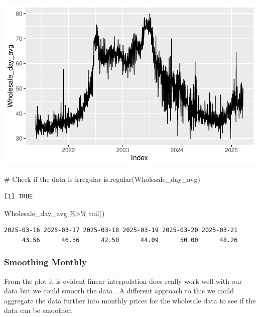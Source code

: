 \documentclass[
  letterpaper,
  DIV=11,
  numbers=noendperiod]{scrartcl}
\newenvironment{Shaded}{\begin{snugshade}}{\end{snugshade}}
\newcommand{\CommentTok}[1]{\textcolor[rgb]{0.37,0.37,0.37}{#1}}
\newcommand{\FunctionTok}[1]{\textcolor[rgb]{0.28,0.35,0.67}{#1}}
\newcommand{\NormalTok}[1]{\textcolor[rgb]{0.00,0.23,0.31}{#1}}
\newcommand{\SpecialCharTok}[1]{\textcolor[rgb]{0.37,0.37,0.37}{#1}}
\begin{document}
\includegraphics{Maize_analysis_files/figure-pdf/unnamed-chunk-15-1.pdf}

\begin{Shaded}
\begin{Highlighting}[]
\CommentTok{\# Check if the data is irregular}
\FunctionTok{is.regular}\NormalTok{(Wholesale\_day\_avg) }
\end{Highlighting}
\end{Shaded}

\begin{verbatim}
[1] TRUE
\end{verbatim}

\begin{Shaded}
\begin{Highlighting}[]
\NormalTok{Wholesale\_day\_avg }\SpecialCharTok{\%\textgreater{}\%} \FunctionTok{tail}\NormalTok{()}
\end{Highlighting}
\end{Shaded}

\begin{verbatim}
2025-03-16 2025-03-17 2025-03-18 2025-03-19 2025-03-20 2025-03-21 
     43.56      46.56      42.50      44.09      50.00      48.26 
\end{verbatim}

\subsubsection{Smoothing Monthly}\label{smoothing-monthly}

From the plot it is evident linear interpolation does really work well
with our data but we could smooth the data . A different approach to
this we could aggregate the data further into monthly prices for the
wholesale data to see if the data can be smoother.
\end{document}
